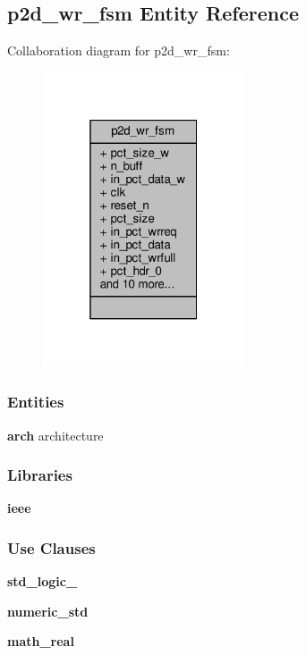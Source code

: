 \subsection{p2d\+\_\+wr\+\_\+fsm Entity Reference}
\label{classp2d__wr__fsm}


Collaboration diagram for p2d\+\_\+wr\+\_\+fsm\+:\nopagebreak
\begin{figure}[H]
\begin{center}
\leavevmode
\includegraphics[width=169pt]{d9/dbc/classp2d__wr__fsm__coll__graph}
\end{center}
\end{figure}
\subsubsection*{Entities}
\begin{DoxyCompactItemize}
\item 
{\bf arch} architecture
\end{DoxyCompactItemize}
\subsubsection*{Libraries}
 \begin{DoxyCompactItemize}
\item 
{\bf ieee} 
\end{DoxyCompactItemize}
\subsubsection*{Use Clauses}
 \begin{DoxyCompactItemize}
\item 
{\bf std\+\_\+logic\+\_}   
\item 
{\bf numeric\+\_\+std}   
\item 
{\bf math\+\_\+real}   
\end{DoxyCompactItemize}
